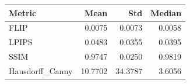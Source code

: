 \begin{tabular}{lrrr}
\toprule
Metric & Mean & Std & Median \\
\midrule
FLIP & 0.0075 & 0.0073 & 0.0058 \\
LPIPS & 0.0483 & 0.0355 & 0.0395 \\
SSIM & 0.9747 & 0.0250 & 0.9819 \\
Hausdorff\_Canny & 10.7702 & 34.3787 & 3.6056 \\
\bottomrule
\end{tabular}
